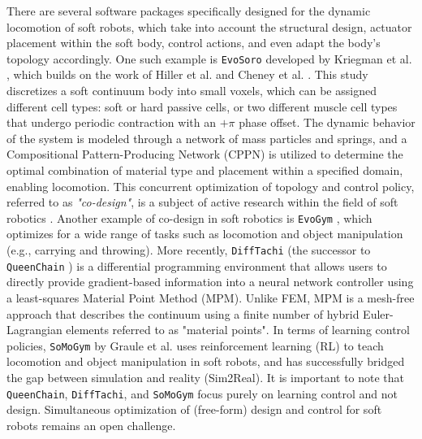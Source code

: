 There are several software packages specifically designed for the dynamic locomotion of soft robots, which take into account the structural design, actuator placement within the soft body, control actions, and even adapt the body's topology accordingly. One such example is \texttt{EvoSoro} developed by Kriegman et al. \cite{Kriegman2020}, which builds on the work of Hiller et al. \cite{Hiller2014} and Cheney et al. \cite{Cheney2013}. This study discretizes a soft continuum body into small voxels, which can be assigned different cell types: soft or hard passive cells, or two different muscle cell types that undergo periodic contraction with an $+\pi$ phase offset. The dynamic behavior of the system is modeled through a network of mass particles and springs, and a Compositional Pattern-Producing Network (CPPN) is utilized to determine the optimal combination of material type and placement within a specified domain, enabling locomotion. This concurrent optimization of topology and control policy, referred to as \emph{"co-design"}, is a subject of active research within the field of soft robotics \cite{Xavier2022Jun}. Another example of co-design in soft robotics is \texttt{EvoGym} \cite{Bhatia2022}, which optimizes for a wide range of tasks such as locomotion and object manipulation (e.g., carrying and throwing). More recently, \texttt{DiffTachi} (the successor to \texttt{QueenChain} \cite{Hu2019May}) is a differential programming environment that allows users to directly provide gradient-based information into a neural network controller using a least-squares Material Point Method (MPM). Unlike FEM, MPM is a mesh-free approach that describes the continuum using a finite number of hybrid Euler-Lagrangian elements referred to as "material points". In terms of learning control policies, \texttt{SoMoGym} by Graule et al. \cite{Graule2022} uses reinforcement learning (RL) to teach locomotion and object manipulation in soft robots, and has successfully bridged the gap between simulation and reality (Sim2Real). It is important to note that \texttt{QueenChain}, \texttt{DiffTachi}, and \texttt{SoMoGym} focus purely on learning control and not design. Simultaneous optimization of (free-form) design and control for soft robots remains an open challenge.

